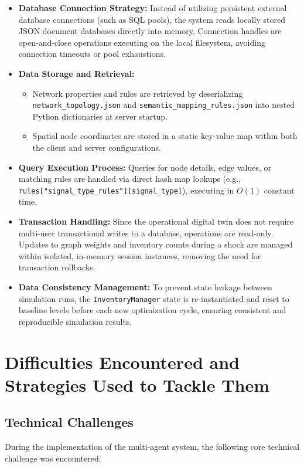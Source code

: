 \begin{itemize}
    \item \textbf{Database Connection Strategy:} 
    Instead of utilizing persistent external database connections (such as SQL pools), the system reads locally stored JSON document databases directly into memory. Connection handles are open-and-close operations executing on the local filesystem, avoiding connection timeouts or pool exhaustions.
    \item \textbf{Data Storage and Retrieval:} 
    \begin{itemize}
        \item Network properties and rules are retrieved by deserializing \texttt{network\_topology.json} and \texttt{semantic\_mapping\_rules.json} into nested Python dictionaries at server startup.
        \item Spatial node coordinates are stored in a static key-value map within both the client and server configurations.
    \end{itemize}
    \item \textbf{Query Execution Process:} 
    Queries for node details, edge values, or matching rules are handled via direct hash map lookups (e.g., \texttt{rules["signal\_type\_rules"][signal\_type]}), executing in $O(1)$ constant time.
    \item \textbf{Transaction Handling:} 
    Since the operational digital twin does not require multi-user transactional writes to a database, operations are read-only. Updates to graph weights and inventory counts during a shock are managed within isolated, in-memory session instances, removing the need for transaction rollbacks.
    \item \textbf{Data Consistency Management:} 
    To prevent state leakage between simulation runs, the \texttt{InventoryManager} state is re-instantiated and reset to baseline levels before each new optimization cycle, ensuring consistent and reproducible simulation results.
\end{itemize}
\section[Difficulties Encountered and Strategies Used to Tackle Them]{Difficulties Encountered and Strategies Used to Tackle Them}

\subsection[Technical Challenges]{Technical Challenges}
During the implementation of the multi-agent system, the following core technical challenge was encountered:

